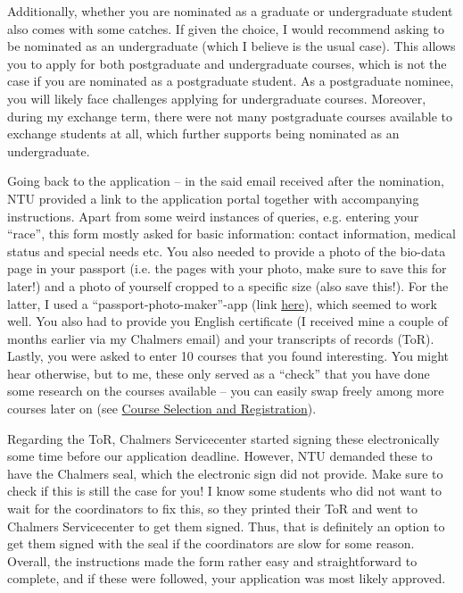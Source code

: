 Additionally, whether you are nominated as a graduate or undergraduate student also comes with some catches. If given the choice, I would recommend asking to be nominated as an undergraduate (which I believe is the usual case). This allows you to apply for both postgraduate and undergraduate courses, which is not the case if you are nominated as a postgraduate student. As a postgraduate nominee, you will likely face challenges applying for undergraduate courses. Moreover, during my exchange term, there were not many postgraduate courses available to exchange students at all, which further supports being nominated as an undergraduate.

Going back to the application -- in the said email received after the nomination, NTU provided a link to the application portal together with accompanying instructions. Apart from some weird instances of queries, e.g. entering your ``race'', this form mostly asked for basic information: contact information, medical status and special needs etc. You also needed to provide a photo of the bio-data page in your passport (i.e. the pages with your photo, make sure to save this for later!) and a photo of yourself cropped to a specific size (also save this!). For the latter, I used a ``passport-photo-maker''-app (link \href{https://www.google.com/url?sa=t&source=web&rct=j&opi=89978449&url=https://apps.apple.com/se/app/passport-size-photo-maker-app/id1615533705&ved=2ahUKEwjq7fmg14eKAxXlIRAIHYyYDKcQFnoECEIQAQ&usg=AOvVaw2MFZUfJ5qukJls3hL6DmwZ}{here}), which seemed to work well. You also had to provide you English certificate (I received mine a couple of months earlier via my Chalmers email) and your transcripts of records (ToR).  Lastly, you were asked to enter 10 courses that you found interesting. You might hear otherwise, but to me, these only served as a ``check'' that you have done some research on the courses available -- you can easily swap freely among more courses later on (see \hyperref[courses]{Course Selection and Registration}).

Regarding the ToR, Chalmers Servicecenter started signing these electronically some time before our application deadline. However, NTU demanded these to have the Chalmers seal, which the electronic sign did not provide. Make sure to check if this is still the case for you! I know some students who did not want to wait for the coordinators to fix this, so they printed their ToR and went to Chalmers Servicecenter to get them signed. Thus, that is definitely an option to get them signed with the seal if the coordinators are slow for some reason. Overall, the instructions made the form rather easy and straightforward to complete, and if these were followed, your application was most likely approved.
